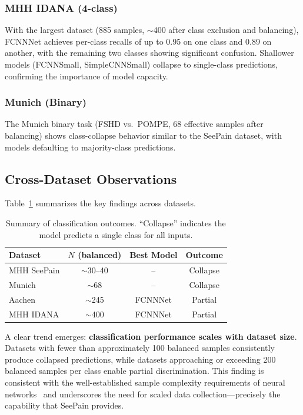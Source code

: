 \documentclass[conference]{IEEEtran}
\begin{document}
\subsubsection{MHH IDANA (4-class)}
With the largest dataset (885 samples, $\sim$400 after class exclusion and balancing), FCNNNet achieves per-class recalls of up to 0.95 on one class and 0.89 on another, with the remaining two classes showing significant confusion. Shallower models (FCNNSmall, SimpleCNNSmall) collapse to single-class predictions, confirming the importance of model capacity.

\subsubsection{Munich (Binary)}
The Munich binary task (FSHD vs.\ POMPE, 68 effective samples after balancing) shows class-collapse behavior similar to the SeePain dataset, with models defaulting to majority-class predictions.

\subsection{Cross-Dataset Observations}

Table~\ref{tab:summary_results} summarizes the key findings across datasets.

\begin{table}[t]
\centering
\caption{Summary of classification outcomes. ``Collapse'' indicates the model predicts a single class for all inputs.}
\label{tab:summary_results}
\begin{tabular}{@{}lccc@{}}
\toprule
\textbf{Dataset} & \textbf{$N$ (balanced)} & \textbf{Best Model} & \textbf{Outcome} \\
\midrule
MHH SeePain & $\sim$30--40 & -- & Collapse \\
Munich & $\sim$68 & -- & Collapse \\
Aachen & $\sim$245 & FCNNNet & Partial \\
MHH IDANA & $\sim$400 & FCNNNet & Partial \\
\bottomrule
\end{tabular}
\end{table}

A clear trend emerges: \textbf{classification performance scales with dataset size}. Datasets with fewer than approximately 100 balanced samples consistently produce collapsed predictions, while datasets approaching or exceeding 200 balanced samples per class enable partial discrimination. This finding is consistent with the well-established sample complexity requirements of neural networks~\cite{shorten2019} and underscores the need for scaled data collection—precisely the capability that SeePain provides.
\end{document}
